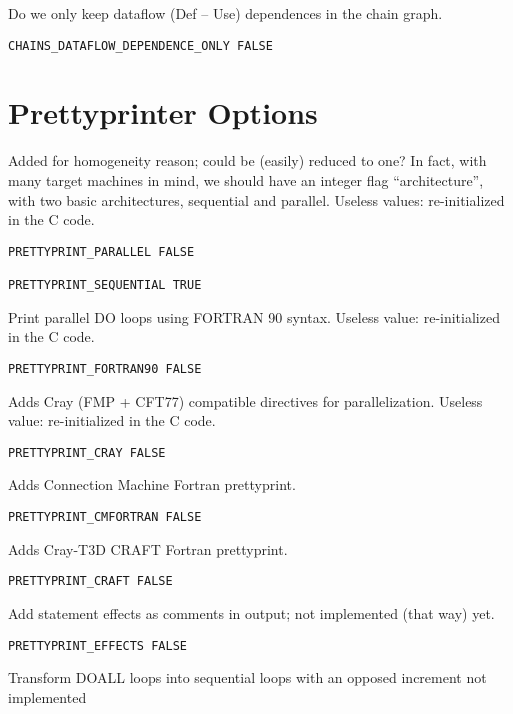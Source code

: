 Do we only keep dataflow (Def -- Use) dependences in the chain graph.

\begin{verbatim}
CHAINS_DATAFLOW_DEPENDENCE_ONLY FALSE
\end{verbatim}

\section{Prettyprinter Options}

Added for homogeneity reason; could be (easily) reduced to one?  In
fact, with many target machines in mind, we should have an integer flag
``architecture'', with two basic architectures, sequential and parallel.
Useless values: re-initialized in the C code.

\begin{verbatim}
PRETTYPRINT_PARALLEL FALSE

PRETTYPRINT_SEQUENTIAL TRUE
\end{verbatim}

Print parallel DO loops using FORTRAN 90 syntax. Useless value:
re-initialized in the C code.

\begin{verbatim}
PRETTYPRINT_FORTRAN90 FALSE
\end{verbatim}

Adds Cray (FMP + CFT77) compatible directives for parallelization.
Useless value: re-initialized in the C code.

\begin{verbatim}
PRETTYPRINT_CRAY FALSE
\end{verbatim}

Adds Connection Machine Fortran prettyprint.

\begin{verbatim}
PRETTYPRINT_CMFORTRAN FALSE
\end{verbatim}

Adds Cray-T3D CRAFT Fortran prettyprint.

\begin{verbatim}
PRETTYPRINT_CRAFT FALSE
\end{verbatim}

Add statement effects as comments in output; not implemented (that way) yet.

\begin{verbatim}
PRETTYPRINT_EFFECTS FALSE
\end{verbatim}

Transform DOALL loops into sequential loops with an opposed increment
not implemented

